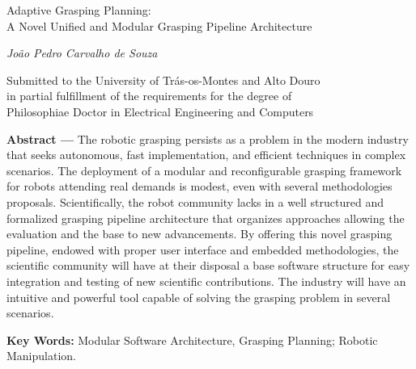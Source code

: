 
\begin{center}
\large{Adaptive Grasping Planning: \\A Novel Unified and Modular Grasping Pipeline Architecture}

\vskip5mm
\normalsize{\textit{João Pedro Carvalho de Souza}}

\vskip5mm
\small{Submitted to the University of Trás-os-Montes and Alto Douro \\
in partial fulfillment of the requirements for the degree of \\
Philosophiae Doctor in Electrical Engineering and Computers}
\end{center}

\textbf{Abstract ---} 
\sloppy
 The robotic grasping persists as a problem in the modern industry that seeks autonomous, fast implementation, and efficient techniques in complex scenarios. The deployment of a modular and reconfigurable grasping framework for robots attending real demands is modest, even with several methodologies proposals. Scientifically, the robot community lacks in a well structured and formalized grasping pipeline architecture that organizes approaches allowing the evaluation and the base to new advancements. By offering this novel grasping pipeline, endowed with proper user interface and embedded methodologies, the scientific community will have at their disposal a base software structure for easy integration and testing of new scientific contributions. The industry will have an intuitive and powerful tool capable of solving the grasping problem in several scenarios.
 
\textbf{Key Words:} Modular Software Architecture, Grasping Planning; Robotic Manipulation. 

